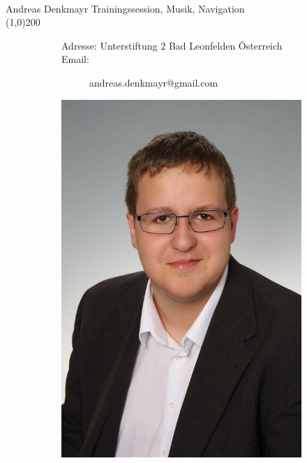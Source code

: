 \documentclass[FIPLY_base.tex]{subfiles}
\begin{document}
\begin{figure}[H]
\begin{subfigure}[b]{0.2\textwidth}
		\end{subfigure}
	\end{figure}
	\ \\
	{\Large Andreas Denkmayr} \newline
	Trainingssession, Musik, Navigation
	\ \\
	\line(1,0){200}
	\begin{figure}[H]
		\begin{subfigure}[b]{0.3\textwidth}
			Adresse: \newline
			Unterstiftung 2  Bad Leonfelden \newline
			Österreich \newline
			\newline
			Email:
			\begin{subfigure}[b]{0.2\textwidth}
				andreas.denkmayr@gmail.com
			\end{subfigure}
		\end{subfigure}
		\hfil
		\begin{subfigure}[b]{0.2\textwidth}
			\includegraphics[scale=0.1]{img/senki}
		\end{subfigure}
	\end{figure}
\end{document}
